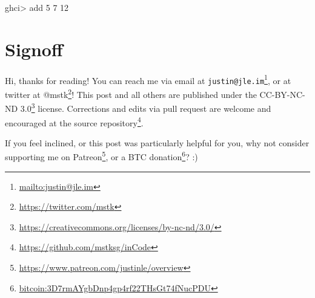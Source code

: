 \documentclass[]{article}
\newenvironment{Shaded}{}{}
\newcommand{\DecValTok}[1]{\textcolor[rgb]{0.25,0.63,0.44}{#1}}
\newcommand{\NormalTok}[1]{#1}
\newcommand{\OperatorTok}[1]{\textcolor[rgb]{0.40,0.40,0.40}{#1}}
\renewcommand{\href}[2]{#2\footnote{\url{#1}}}
\begin{document}
\begin{Shaded}
\begin{Highlighting}[]
\NormalTok{ghci}\OperatorTok{>}\NormalTok{ add }\DecValTok{5} \DecValTok{7}
\DecValTok{12}
\end{Highlighting}
\end{Shaded}

\hypertarget{signoff}{%
\section{Signoff}\label{signoff}}

Hi, thanks for reading! You can reach me via email at
\href{mailto:justin@jle.im}{\nolinkurl{justin@jle.im}}, or at twitter at
\href{https://twitter.com/mstk}{@mstk}! This post and all others are published
under the \href{https://creativecommons.org/licenses/by-nc-nd/3.0/}{CC-BY-NC-ND
3.0} license. Corrections and edits via pull request are welcome and encouraged
at \href{https://github.com/mstksg/inCode}{the source repository}.

If you feel inclined, or this post was particularly helpful for you, why not
consider \href{https://www.patreon.com/justinle/overview}{supporting me on
Patreon}, or a \href{bitcoin:3D7rmAYgbDnp4gp4rf22THsGt74fNucPDU}{BTC donation}?
:)
\end{document}

